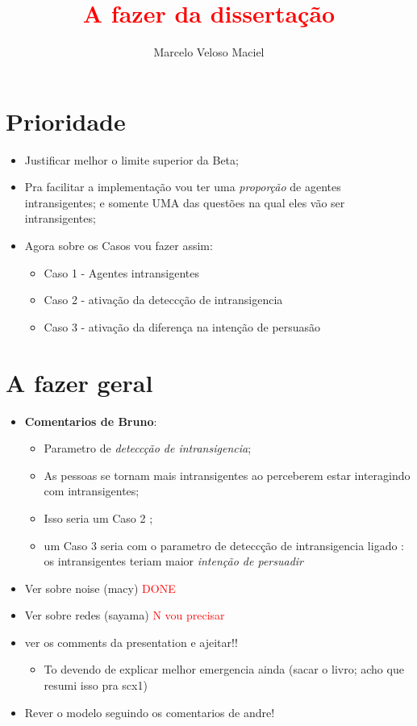 \documentclass{article}
\title{\textcolor{red}{A fazer da dissertação}}
\author{Marcelo Veloso Maciel}
\date{}
\begin{document}
\pagecolor{base03}
\color{base1}

\maketitle


\section*{Prioridade}
\begin{itemize}
\item Justificar melhor o limite superior da Beta;
\item Pra facilitar a implementação vou ter uma \textit{proporção} de agentes
  intransigentes; e somente UMA das questões na qual eles vão ser
  intransigentes;
\item Agora sobre os Casos vou fazer assim:
  \begin{itemize}
  \item Caso 1 - Agentes intransigentes
  \item Caso 2 - ativação da deteccção de intransigencia
  \item Caso 3 - ativação da diferença na intenção de persuasão
  \end{itemize}
\end{itemize}

\section*{A fazer geral}

\begin{itemize}
\item \textbf{Comentarios de Bruno}:
  \begin{itemize}
  \item Parametro de \textit{deteccção de intransigencia};
  \item As pessoas se tornam mais intransigentes ao perceberem estar interagindo
    com intransigentes;
  \item Isso seria um Caso 2 ; 
  \item um Caso 3 seria com o parametro de deteccção de intransigencia ligado :
    os intransigentes teriam maior \textit{intenção de persuadir}
  \end{itemize}
  \item Ver sobre noise (macy) \textcolor{red}{DONE}
  \item Ver sobre redes (sayama)  \textcolor{red}{N vou precisar}
  \item ver os comments da presentation e ajeitar!!
    \begin{itemize}
    \item To devendo de explicar melhor emergencia ainda (sacar o livro; acho
      que resumi isso pra scx1)
    \end{itemize}
  \item Rever o modelo seguindo os comentarios de andre!


\end{itemize}
\end{document}
